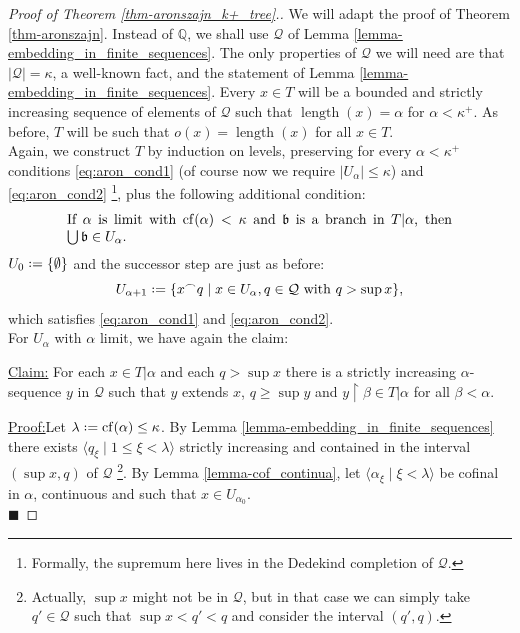 \documentclass[11pt,a4paper]{report}
\theoremstyle{definition}
\theoremstyle{num.custom-title}
\theoremstyle{custom-title}
\newenvironment{claim}[1]{\par\noindent\underline{Claim#1:}\space}{} %
\newenvironment{claimproof}[1]{\par\noindent\underline{Proof:}\space#1}{\leavevmode\unskip\penalty9999 \hbox{}\nobreak\hfill\quad\hbox{$\blacksquare$}} %
\DeclareMathOperator{\length}{length}
\DeclareMathOperator{\restr}{\upharpoonright}
\DeclareMathOperator{\cf}{cf}
\newcommand{\Q}{\mathbb{Q}}
\newcommand{\conc}{^\frown}
\newcommand*{\defeq}{\mathrel{\rlap{%
                     \raisebox{0.3ex}{$\cdot$}}%
                     \raisebox{-0.3ex}{$\cdot$}}%
                     =}
\begin{document}
\begin{proof}[Proof of Theorem \ref{thm-aronszajn_k+_tree}.]
\renewcommand{\Q}{\mathcal{Q}}
We will adapt the proof of Theorem \ref{thm-aronszajn}. Instead of $\mathbb Q$, we shall use $\Q$ of Lemma \ref{lemma-embedding_in_finite_sequences}. The only properties of $\Q$ we will need are that $|\Q|=\kappa$, a well-known fact, and the statement of Lemma \ref{lemma-embedding_in_finite_sequences}. Every $x \in T$ will be a bounded and strictly increasing sequence of elements of $\Q$ such that $\length(x)=\alpha$ for $\alpha < \kappa^+$. As before, $T$ will be such that $o(x)=\length(x)$ for all $x \in T$.\\
Again, we construct $T$ by induction on levels, preserving for every $\alpha < \kappa^+$ conditions \eqref{eq:aron_cond1} (of course now we require $|U_\alpha| \leq \kappa$) and \eqref{eq:aron_cond2} \footnote{Formally, the supremum here lives in the Dedekind completion of $\Q$.}, plus the following additional condition:
\begin{equation}\label{eq:aron_cond3}
\begin{minipage}[t]{0.8\textwidth}
If $\alpha$ is limit with $\cf(\alpha) < \kappa$ and $\mathfrak{b}$ is a branch in $T|\alpha$, then $\bigcup \mathfrak{b} \in U_\alpha$.
\end{minipage}
\end{equation}
$U_0 \defeq \{\emptyset\}$ and the successor step are just as before:
\[
U_{\alpha+1} \defeq \{x \conc q \mid x \in U_\alpha, q \in \Q \text{ with } q > \sup x \},
\]
which satisfies \eqref{eq:aron_cond1} and \eqref{eq:aron_cond2}.\\
For $U_\alpha$ with $\alpha$ limit, we have again the claim:
\begin{claim}{}
For each $x \in T|\alpha$ and each $q > \sup x$ there is a strictly increasing $\alpha$-sequence $y$ in $\Q$ such that $y$ extends $x$, $q \geq \sup y$ and $y \restr \beta \in T|\alpha$ for all $\beta<\alpha$.
\begin{claimproof}
Let $\lambda \defeq \cf(\alpha) \leq \kappa$. By Lemma \ref{lemma-embedding_in_finite_sequences} there exists $\langle q_\xi \mid 1 \leq \xi < \lambda \rangle$ strictly increasing and contained in the interval $(\sup x, q)$ of $\Q$ \footnote{Actually, $\sup x$ might not be in $\Q$, but in that case we can simply take $q' \in \Q$ such that $\sup x < q' < q$ and consider the interval $(q',q)$.}. By Lemma 	\ref{lemma-cof_continua}, let $\langle \alpha_\xi \mid \xi < \lambda \rangle$ be cofinal in $\alpha$, continuous and such that $x \in U_{\alpha_0}$.\\

\end{claimproof}
\end{claim}
\end{proof}
\end{document}
